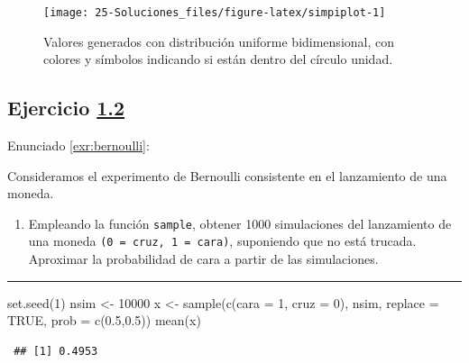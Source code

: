 \documentclass[
]{book}
\newenvironment{Shaded}{\begin{snugshade}}{\end{snugshade}}
\newcommand{\AttributeTok}[1]{\textcolor[rgb]{0.77,0.63,0.00}{#1}}
\newcommand{\ConstantTok}[1]{\textcolor[rgb]{0.00,0.00,0.00}{#1}}
\newcommand{\DecValTok}[1]{\textcolor[rgb]{0.00,0.00,0.81}{#1}}
\newcommand{\FloatTok}[1]{\textcolor[rgb]{0.00,0.00,0.81}{#1}}
\newcommand{\FunctionTok}[1]{\textcolor[rgb]{0.00,0.00,0.00}{#1}}
\newcommand{\NormalTok}[1]{#1}
\newcommand{\OtherTok}[1]{\textcolor[rgb]{0.56,0.35,0.01}{#1}}
\providecommand{\tightlist}{%
  \setlength{\itemsep}{0pt}\setlength{\parskip}{0pt}}
\theoremstyle{break}
\theoremstyle{nonumberplain}
\begin{document}
\begin{figure}[!htb]

{\centering \texttt{[image: 25-Soluciones\_files/figure-latex/simpiplot-1]} 

}

\caption{Valores generados con distribución uniforme bidimensional, con colores y símbolos indicando si están dentro del círculo unidad.}\label{fig:simpiplot}
\end{figure}

\hypertarget{sol-bernoulli}{%
\subsection{\texorpdfstring{Ejercicio \href{ejercicios.html\#exr:bernoulli}{1.2}}{Ejercicio 1.2}}\label{sol-bernoulli}}

Enunciado \ref{exr:bernoulli}:

Consideramos el experimento de Bernoulli consistente en el
lanzamiento de una moneda.

\begin{enumerate}
\def\labelenumi{\alph{enumi})}
\tightlist
\item
  Empleando la función \texttt{sample}, obtener 1000 simulaciones del
  lanzamiento de una moneda \texttt{(0\ =\ cruz,\ 1\ =\ cara)}, suponiendo que
  no está trucada. Aproximar la probabilidad de cara a partir de
  las simulaciones.
\end{enumerate}

\begin{center}\rule{0.5\linewidth}{0.5pt}\end{center}

\begin{Shaded}
\begin{Highlighting}[]
\FunctionTok{set.seed}\NormalTok{(}\DecValTok{1}\NormalTok{)}
\NormalTok{nsim }\OtherTok{\textless{}{-}} \DecValTok{10000}
\NormalTok{x }\OtherTok{\textless{}{-}} \FunctionTok{sample}\NormalTok{(}\FunctionTok{c}\NormalTok{(}\AttributeTok{cara =} \DecValTok{1}\NormalTok{, }\AttributeTok{cruz =} \DecValTok{0}\NormalTok{), nsim, }\AttributeTok{replace =} \ConstantTok{TRUE}\NormalTok{, }\AttributeTok{prob =} \FunctionTok{c}\NormalTok{(}\FloatTok{0.5}\NormalTok{,}\FloatTok{0.5}\NormalTok{))}
\FunctionTok{mean}\NormalTok{(x)}
\end{Highlighting}
\end{Shaded}

\begin{verbatim}
 ## [1] 0.4953
\end{verbatim}
\end{document}
